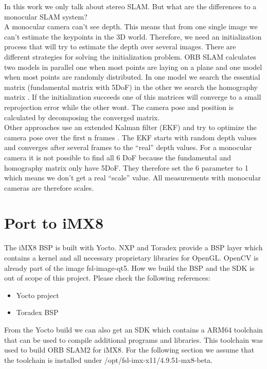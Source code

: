 \documentclass[11pt,a4paper,titlepage,oneside]{report}
\begin{document}
In this work we only talk about stereo SLAM. But what are the differences to a monocular SLAM system?\\
A monocular camera can't see depth. This means that from one single image we can't estimate the keypoints in the 3D world. Therefore, we need an initialization process that will try to estimate the depth over several images. There are different strategies for solving the initialization problem. ORB SLAM calculates two models in parallel one when most points are laying on a plane and one model when most points are randomly distributed. In one model we search the essential matrix (fundamental matrix with 5DoF) in the other we search the homography matrix \cite{orbslam}. If the initialization succeeds one of this matrices will converge to a small reprojection error while the other wont. The camera pose and position is calculated by decomposing the converged matrix.\\
Other approaches use an extended Kalman filter (EKF) and try to optimize the camera pose over the first n frames \cite{svo}. The EKF starts with random depth values and converges after several frames to the ``real'' depth values. For a monocular camera it is not possible to find all 6 DoF because the fundamental and homography matrix only have 5DoF. They therefore set the 6 parameter to 1 which means we don't get a real ``scale'' value. All measurements with monocular cameras are therefore scales.

\section{Port to iMX8}\label{sec:orbport}

The iMX8 BSP is built with Yocto. NXP and Toradex provide a BSP layer which contains a kernel and all necessary proprietary libraries for OpenGL. OpenCV is already part of the image fsl-image-qt5. How we build the BSP and the SDK is out of scope of this project. Please check the following references:\\
\begin{itemize}
	\item Yocto project \cite{yocto}
	\item Toradex BSP \cite{toradex_bsp}
\end{itemize}

From the Yocto build we can also get an SDK which contains a ARM64 toolchain that can be used to compile additional programs and libraries. This toolchain was used to build ORB SLAM2 for iMX8. For the following section we assume that the toolchain is installed under /opt/fsl-imx-x11/4.9.51-mx8-beta.
\end{document}

